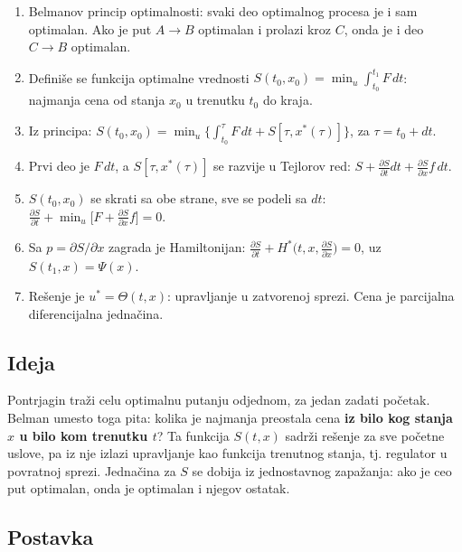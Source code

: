 \documentclass[11pt,a4paper,parskip=half,headsepline,numbers=noenddot]{scrartcl}
\begin{document}
\begin{kljucna}
\begin{enumerate}
\def\labelenumi{\arabic{enumi}.}
\item Belmanov princip optimalnosti: svaki deo optimalnog procesa je i sam optimalan. Ako je put \(A \to B\) optimalan i prolazi kroz \(C\), onda je i deo \(C \to B\) optimalan.
\item Definiše se funkcija optimalne vrednosti \(S(t_0, x_0) = \min_u\int_{t_0}^{t_1}F\,dt\): najmanja cena od stanja \(x_0\) u trenutku \(t_0\) do kraja.
\item Iz principa: \(S(t_0, x_0) = \min_u\big\{\int_{t_0}^{\tau}F\,dt + S[\tau, x^*(\tau)]\big\}\), za \(\tau = t_0 + dt\).
\item Prvi deo je \(F\,dt\), a \(S[\tau, x^*(\tau)]\) se razvije u Tejlorov red: \(S + \frac{\partial S}{\partial t}dt + \frac{\partial S}{\partial x}f\,dt\).
\item \(S(t_0, x_0)\) se skrati sa obe strane, sve se podeli sa \(dt\): \(\frac{\partial S}{\partial t} + \min_u\big[F + \frac{\partial S}{\partial x}f\big] = 0\).
\item Sa \(p = \partial S/\partial x\) zagrada je Hamiltonijan: \(\frac{\partial S}{\partial t} + H^*\big(t, x, \frac{\partial S}{\partial x}\big) = 0\), uz \(S(t_1, x) = \Psi(x)\).
\item Rešenje je \(u^* = \Theta(t, x)\): upravljanje u zatvorenoj sprezi. Cena je parcijalna diferencijalna jednačina.
\end{enumerate}
\end{kljucna}

\subsection{Ideja}

Pontrjagin traži celu optimalnu putanju odjednom, za jedan zadati početak. Belman umesto toga pita: kolika je najmanja preostala cena \textbf{iz bilo kog stanja \(x\) u bilo kom trenutku \(t\)}? Ta funkcija \(S(t, x)\) sadrži rešenje za sve početne uslove, pa iz nje izlazi upravljanje kao funkcija trenutnog stanja, tj. regulator u povratnoj sprezi. Jednačina za \(S\) se dobija iz jednostavnog zapažanja: ako je ceo put optimalan, onda je optimalan i njegov ostatak.

\subsection{Postavka}
\end{document}
